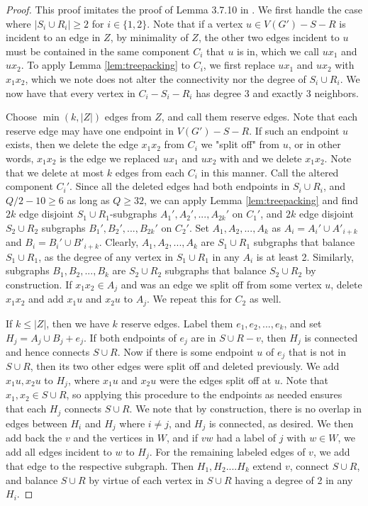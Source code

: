 \documentclass{article}
\begin{document}
\begin{proof}
    This proof imitates the proof of Lemma 3.7.10 in \cite{lau-thesis}. We first handle the case where $|S_i \cup R_i| \geq 2$ for $i \in \{1,2\}$. Note that if a vertex $u \in V(G')-S-R$ is incident to an edge in $Z$, by minimality of $Z$, the other two edges incident to $u$ must be contained in the same component $C_i$ that $u$ is in, which we call $ux_1$ and $ux_2$. To apply Lemma \ref{lem:treepacking} to $C_i$, we first replace $ux_1$ and $ux_2$ with $x_1x_2$, which we note does not alter the connectivity nor the degree of $S_i \cup R_i$. We now have that every vertex in $C_i-S_i-R_i$ has degree 3 and exactly 3 neighbors. 

    Choose $\min(k,|Z|)$ edges from $Z$, and call them reserve edges. Note that each reserve edge may have one endpoint in $V(G')-S-R$. If such an endpoint $u$ exists, then we delete the edge $x_1x_2$ from $C_i$ we "split off" from $u$, or in other words, $x_1x_2$ is the edge we replaced $ux_1$ and $ux_2$ with and we delete $x_1x_2$. Note that we delete at most $k$ edges from each $C_i$ in this manner. Call the altered component $C_i'$. Since all the deleted edges had both endpoints in $S_i \cup R_i$, and $Q/2-10 \geq 6$ as long as $Q \geq 32$, we can apply Lemma \ref{lem:treepacking} and find $2k$ edge disjoint $S_1 \cup R_1$-subgraphs $A_1',A_2',...,A_{2k}'$ on $C_1'$, and $2k$ edge disjoint $S_2 \cup R_2$ subgraphs $B_1',B_2',...,B_{2k}'$ on $C_2'$. Set $A_1,A_2,...,A_k$ as $A_i = A_i' \cup A'_{i+k}$ and $B_i = B_i' \cup B'_{i+k}$. Clearly, $A_1,A_2,...,A_k$ are $S_1 \cup R_1$ subgraphs that balance $S_1 \cup R_1$, as the degree of any vertex in $S_1 \cup R_1$ in any $A_i$ is at least 2. Similarly, subgraphs $B_1,B_2,...,B_k$ are $S_2 \cup R_2$ subgraphs that balance $S_2 \cup R_2$ by construction. If $x_1x_2 \in A_j$ and was an edge we split off from some vertex $u$, delete $x_1x_2$ and add $x_1u$ and $x_2u$ to $A_j$. We repeat this for $C_2$ as well. 

    If $k \leq |Z|$, then we have $k$ reserve edges. Label them $e_1,e_2,...,e_k$, and set $H_j = A_j \cup B_j + e_j$. If both endpoints of $e_j$ are in $S \cup R-v$, then $H_j$ is connected and hence connects $S \cup R$. Now if there is some endpoint $u$ of $e_j$ that is not in $S \cup R$, then its two other edges were split off and deleted previously. We add $x_1u,x_2u$ to $H_j$, where $x_1u$ and $x_2u$ were the edges split off at $u$. Note that $x_1,x_2 \in S \cup R$, so applying this procedure to the endpoints as needed ensures that each $H_j$ connects $S \cup R$. We note that by construction, there is no overlap in edges between $H_i$ and $H_j$ where $i \not=j$, and $H_j$ is connected, as desired. We then add back the $v$ and the vertices in $W$, and if $vw$ had a label of $j$ with $w \in W$, we add all edges incident to $w$ to $H_j$. For the remaining labeled edges of $v$, we add that edge to the respective subgraph. Then $H_1,H_2....H_k$ extend $v$, connect $S \cup R$, and balance $S \cup R$ by virtue of each vertex in $S \cup R$ having a degree of 2 in any $H_i$.


\end{proof}
\end{document}
